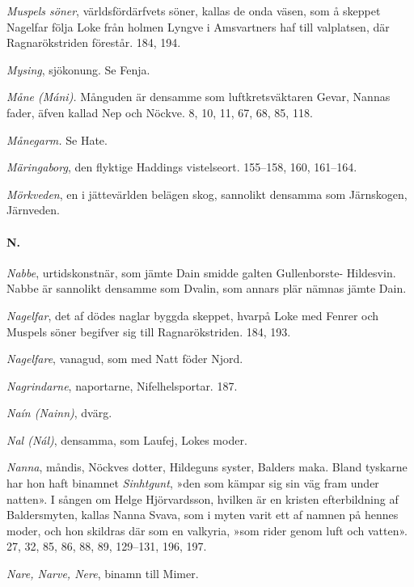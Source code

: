 \emph{Muspels söner}, världsfördärfvets söner, kallas de onda väsen, som
å skeppet Nagelfar följa Loke från holmen Lyngve i Amsvartners haf till
valplatsen, där Ragnarökstriden förestår. 184, 194.

\emph{Mysing}, sjökonung. Se Fenja.

\emph{Måne (Máni).} Månguden är densamme som luftkretsväktaren Gevar,
Nannas fader, äfven kallad Nep och Nöckve. 8, 10, 11, 67, 68, 85, 118.

\emph{Månegarm.} Se Hate.

\emph{Märingaborg}, den flyktige Haddings vistelseort. 155--158, 160,
161--164.

\emph{Mörkveden}, en i jättevärlden belägen skog, sannolikt densamma som
Järnskogen, Järnveden.

\paragraph{N.}

\emph{Nabbe}, urtidskonstnär, som jämte Dain smidde galten Gullenborste-
Hildesvin. Nabbe är sannolikt densamme som Dvalin, som annars plär
nämnas jämte Dain.

\protect\hypertarget{lb1625905.xhtmlux5cux23start233}{}{}\protect\hypertarget{lb1625905.xhtmlux5cux23start233-a}{}{}\protect\hypertarget{lb1625905.xhtmlux5cux23start233-b}{}{}\protect\hypertarget{lb1625905.xhtmlux5cux23start233-c}{}{}\protect\hypertarget{lb1625905.xhtmlux5cux23start233-d}{}{}

\emph{Nagelfar}, det af dödes naglar byggda skeppet, hvarpå Loke med
Fenrer och Muspels söner begifver sig till Ragnarökstriden. 184, 193.

\emph{Nagelfare}, vanagud, som med Natt föder Njord.

\emph{Nagrindarne}, naportarne, Nifelhelsportar. 187.

\emph{Naín (Nainn)}, dvärg.

\emph{Nal (Nál)}, densamma, som Laufej, Lokes moder.

\emph{Nanna}, måndis, Nöckves dotter, Hildeguns syster, Balders maka.
Bland tyskarne har hon haft binamnet \emph{Sinhtgunt}, »den som kämpar
sig sin väg fram under natten». I sången om Helge Hjörvardsson, hvilken
är en kristen efterbildning af Baldersmyten, kallas Nanna Svava, som i
myten varit ett af namnen på hennes moder, och hon skildras där som en
valkyria, »som rider genom luft och vatten». 27, 32, 85, 86, 88, 89,
129--131, 196, 197.

\emph{Nare, Narve, Nere}, binamn till Mimer.

